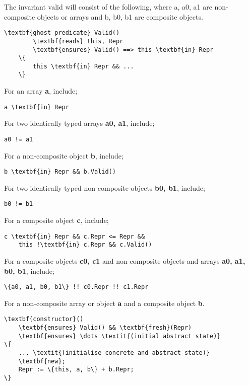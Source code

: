 The invariant valid will consist of the following, where a, a0, a1 are non-composite objects or arrays and b, b0, b1 are composite objects.
\begin{Verbatim}[commandchars=\\\{\}]
    \textbf{ghost predicate} Valid()
        \textbf{reads} this, Repr
        \textbf{ensures} Valid() ==> this \textbf{in} Repr
    \{ 
        this \textbf{in} Repr && ...
    \}
\end{Verbatim}

For an array \textbf{a}, include;
\begin{Verbatim}[commandchars=\\\{\}]
    a \textbf{in} Repr
\end{Verbatim}

For two identically typed arrays \textbf{a0, a1}, include;
\begin{Verbatim}[commandchars=\\\{\}]
    a0 != a1
\end{Verbatim}

For a non-composite object \textbf{b}, include;
\begin{Verbatim}[commandchars=\\\{\}]
    b \textbf{in} Repr && b.Valid()
\end{Verbatim}

For two identically typed non-composite objects \textbf{b0, b1}, include;
\begin{Verbatim}[commandchars=\\\{\}]
    b0 != b1
\end{Verbatim}

For a composite object \textbf{c}, include;
\begin{Verbatim}[commandchars=\\\{\}]
    c \textbf{in} Repr && c.Repr <= Repr && 
    this !\textbf{in} c.Repr && c.Valid()
\end{Verbatim}

For a composite objects \textbf{c0, c1} and non-composite objects and arrays \textbf{a0, a1, b0, b1}, include;
\begin{Verbatim}[commandchars=\\\{\}]
    \{a0, a1, b0, b1\} !! c0.Repr !! c1.Repr  
\end{Verbatim}

For a non-composite array or object \textbf{a} and a composite object \textbf{b}.
\begin{Verbatim}[commandchars=\\\{\}]
\textbf{constructor}()
    \textbf{ensures} Valid() && \textbf{fresh}(Repr)
    \textbf{ensures} \dots \textit{(initial abstract state)}
\{
    ... \textit{(initialise concrete and abstract state)}
    \textbf{new};
    Repr := \{this, a, b\} + b.Repr;
\}
\end{Verbatim}

